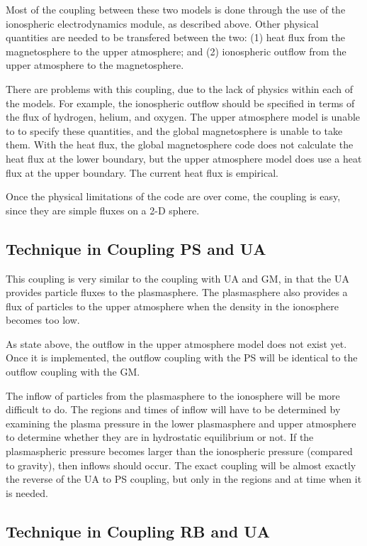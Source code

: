 \documentclass[twoside,10pt]{article}
\begin{document}
Most of the coupling between these two models is done through the use
of the ionospheric electrodynamics module, as described above.  Other
physical quantities are needed to be transfered between the two: (1)
heat flux from the magnetosphere to the upper atmosphere; and (2)
ionospheric outflow from the upper atmosphere to the magnetosphere.

There are problems with this coupling, due to the lack of physics
within each of the models.  For example, the ionospheric outflow
should be specified in terms of the flux of hydrogen, helium, and
oxygen.  The upper atmosphere model is unable to to specify these
quantities, and the global magnetosphere is unable to take them.  With
the heat flux, the global magnetosphere code does not calculate the
heat flux at the lower boundary, but the upper atmosphere model does
use a heat flux at the upper boundary.  The current heat flux is
empirical.

Once the physical limitations of the code are over come, the coupling
is easy, since they are simple fluxes on a 2-D sphere.

\subsection{Technique in Coupling PS and UA}

This coupling is very similar to the coupling with UA and GM, in that
the UA provides particle fluxes to the plasmasphere.  The plasmasphere
also provides a flux of particles to the upper atmosphere when the
density in the ionosphere becomes too low.

As state above, the outflow in the upper atmosphere model does not
exist yet.  Once it is implemented, the outflow coupling with the PS
will be identical to the outflow coupling with the GM.

The inflow of particles from the plasmasphere to the ionosphere will
be more difficult to do.  The regions and times of inflow will have to
be determined by examining the plasma pressure in the lower
plasmasphere and upper atmosphere to determine whether they are in
hydrostatic equilibrium or not.  If the plasmaspheric pressure becomes
larger than the ionospheric pressure (compared to gravity), then
inflows should occur.  The exact coupling will be almost exactly the
reverse of the UA to PS coupling, but only in the regions and at time
when it is needed.

\subsection{Technique in Coupling RB and UA}
\end{document}
